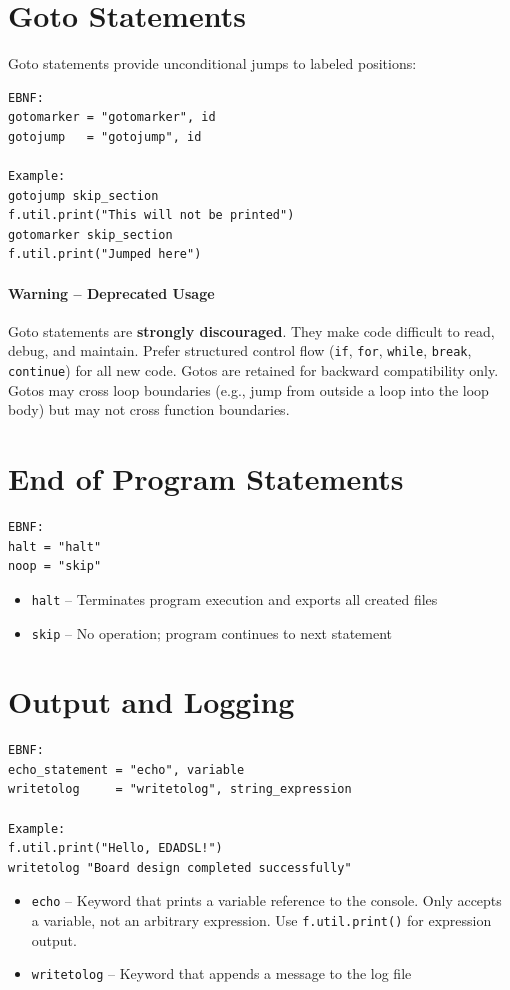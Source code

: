\section{Goto Statements}
Goto statements provide unconditional jumps to labeled positions:
\begin{verbatim}
EBNF:
gotomarker = "gotomarker", id
gotojump   = "gotojump", id

Example:
gotojump skip_section
f.util.print("This will not be printed")
gotomarker skip_section
f.util.print("Jumped here")
\end{verbatim}

\paragraph{Warning -- Deprecated Usage}
Goto statements are \textbf{strongly discouraged}. They make code difficult to read, debug, and maintain. Prefer structured control flow (\texttt{if}, \texttt{for}, \texttt{while}, \texttt{break}, \texttt{continue}) for all new code. Gotos are retained for backward compatibility only. Gotos may cross loop boundaries (e.g., jump from outside a loop into the loop body) but may not cross function boundaries.

\section{End of Program Statements}
\begin{verbatim}
EBNF:
halt = "halt"
noop = "skip"
\end{verbatim}
\begin{itemize}
\item \texttt{halt} -- Terminates program execution and exports all created files
\item \texttt{skip} -- No operation; program continues to next statement
\end{itemize}

\section{Output and Logging}
\begin{verbatim}
EBNF:
echo_statement = "echo", variable
writetolog     = "writetolog", string_expression

Example:
f.util.print("Hello, EDADSL!")
writetolog "Board design completed successfully"
\end{verbatim}
\begin{itemize}
\item \texttt{echo} -- Keyword that prints a variable reference to the console. Only accepts a variable, not an arbitrary expression. Use \texttt{f.util.print()} for expression output.
\item \texttt{writetolog} -- Keyword that appends a message to the log file
\end{itemize}


